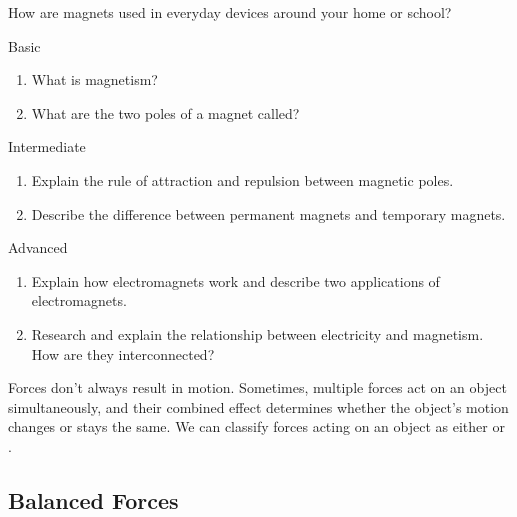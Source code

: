 \begin{stopandthink}
How are magnets used in everyday devices around your home or school?
\end{stopandthink}

\begin{tieredquestions}{Basic}
\begin{enumerate}
    \item What is magnetism?
    \item What are the two poles of a magnet called?
\end{enumerate}
\end{tieredquestions}

\begin{tieredquestions}{Intermediate}
\begin{enumerate}
    \item Explain the rule of attraction and repulsion between magnetic poles.
    \item Describe the difference between permanent magnets and temporary magnets.
\end{enumerate}
\end{tieredquestions}

\begin{tieredquestions}{Advanced}
\begin{enumerate}
    \item  Explain how electromagnets work and describe two applications of electromagnets.
    \item  Research and explain the relationship between electricity and magnetism. How are they interconnected?
\end{enumerate}
\end{tieredquestions}


\FloatBarrier

\begin{marginnote}
\end{marginnote}
Forces don't always result in motion. Sometimes, multiple forces act on an object simultaneously, and their combined effect determines whether the object's motion changes or stays the same.  We can classify forces acting on an object as either  or .

\subsection{Balanced Forces}

